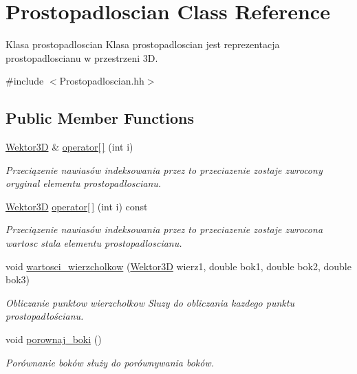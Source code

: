 \hypertarget{classProstopadloscian}{}\section{Prostopadloscian Class Reference}
\label{classProstopadloscian}


Klasa prostopadloscian Klasa prostopadloscian jest reprezentacja prostopadloscianu w przestrzeni 3D.  




{\ttfamily \#include $<$Prostopadloscian.\+hh$>$}

\subsection*{Public Member Functions}
\begin{DoxyCompactItemize}
\item 
\hyperlink{classWektor}{Wektor3D} \& \hyperlink{classProstopadloscian_a91f4a980696e74a98b9a5d3fb62fbabb}{operator\mbox{[}$\,$\mbox{]}} (int i)
\begin{DoxyCompactList}\small\item\em Przeciązenie nawiasów indeksowania przez to przeciazenie zostaje zwrocony oryginal elementu prostopadloscianu. \end{DoxyCompactList}\item 
\hyperlink{classWektor}{Wektor3D} \hyperlink{classProstopadloscian_a94c55b7d1bb2e8fefe105d82cfce5a7e}{operator\mbox{[}$\,$\mbox{]}} (int i) const
\begin{DoxyCompactList}\small\item\em Przeciązenie nawiasów indeksowania przez to przeciazenie zostaje zwrocona wartosc stala elementu prostopadloscianu. \end{DoxyCompactList}\item 
void \hyperlink{classProstopadloscian_aca07adf3c6635ea252713b5326732c8f}{wartosci\+\_\+wierzcholkow} (\hyperlink{classWektor}{Wektor3D} wierz1, double bok1, double bok2, double bok3)
\begin{DoxyCompactList}\small\item\em Obliczanie punktow wierzcholkow Sluzy do obliczania kazdego punktu prostopadłościanu. \end{DoxyCompactList}\item 
void \hyperlink{classProstopadloscian_a8f2fad07ecd0f22a288b9c261170269d}{porownaj\+\_\+boki} ()
\begin{DoxyCompactList}\small\item\em Porównanie boków służy do porównywania boków. \end{DoxyCompactList}\end{DoxyCompactItemize}


